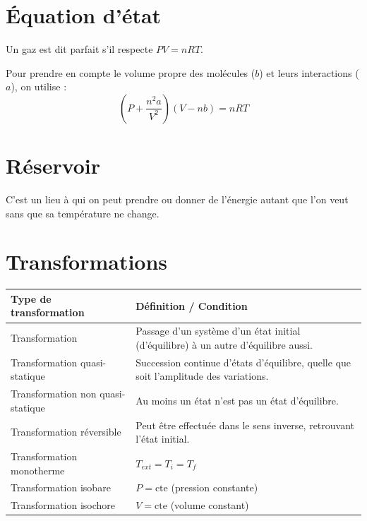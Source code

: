 \documentclass[french]{yLectureNote}
\begin{document}
\section{Équation d'état}

\begin{definition}
    Un gaz est dit parfait s'il respecte $PV = nRT$.

\end{definition}

\begin{definition}
    Pour prendre en compte le volume propre des molécules ($b$) et leurs interactions ($a$), on utilise :
    $$\left( P + \frac{n^2 a}{V^2} \right) (V - nb) = nRT$$

\end{definition}

\section{Réservoir}

\begin{definition}
    C'est un lieu à qui on peut prendre ou donner de l'énergie autant que l'on veut sans que sa température ne change.

\end{definition}

\section{Transformations}

\begin{center}
\begin{tabularx}{\textwidth}{|>{\raggedright\arraybackslash}X|>{\raggedright\arraybackslash}X|}
\hline
\textbf{Type de transformation} & \textbf{Définition / Condition} \\
\hline
Transformation & Passage d'un système d'un état initial (d'équilibre) à un autre d'équilibre aussi. \\
\hline
Transformation quasi-statique & Succession continue d'états d'équilibre, quelle que soit l'amplitude des variations. \\
\hline
Transformation non quasi-statique & Au moins un état n'est pas un état d'équilibre. \\
\hline
Transformation réversible & Peut être effectuée dans le sens inverse, retrouvant l'état initial. \\
\hline
Transformation monotherme & $T_{ext} = T_i = T_f$  \\
\hline
Transformation isobare & $P = \text{cte}$ (pression constante) \\
\hline
Transformation isochore & $V = \text{cte}$ (volume constant) \\
\hline
\end{tabularx}
\end{center}
\end{document}
